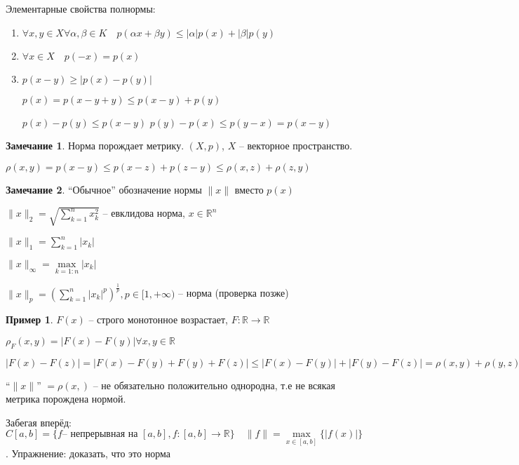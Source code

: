 \documentclass{book}
\newcommand\R{\ensuremath{\mathbb{R}}}
\theoremstyle{definition}
\newtheorem*{note}{Замечание}
\newtheorem*{example}{Пример}
\begin{document}
    Элементарные свойства полнормы:
    \begin{enumerate}
        \item $\forall  x, y\in X \forall \alpha, \beta\in K\quad p(\alpha x+\beta y) \leqslant |\alpha|p(x) + |\beta|p(y)$
        \item $\forall x\in X\quad p(-x) = p(x)$
        \item $p(x-y) \geqslant \left| p(x) - p(y) \right| $

            $p(x) = p(x-y+y) \leqslant p(x-y) + p(y)$

            $p(x) - p(y) \leqslant p(x-y)$
            $p(y) - p(x) \leqslant p(y-x) =p(x-y)$
    \end{enumerate}
    \begin{note}
        Норма порождает метрику. $(X, p)$, $X$ -- векторное пространство.

        $\rho(x, y) = p(x-y) \leqslant p(x-z) + p(z-y) \leqslant  \rho(x, z) + \rho(z, y)$
    \end{note}

    \begin{note}
        ``Обычное'' обозначение нормы $\|x\|$ вместо $p(x)$

        $\|x\|_2 = \sqrt{\sum_{k=1}^{n} x_k^2} $ -- евклидова норма, $x\in \R^n$

        $\|x\|_1 = \sum_{k=1}^{n} |x_k|$

        $\|x\|_{\infty } = \max\limits_{k=1:n} |x_k|$

        $\|x\|_p = \left( \sum_{k=1}^{n} |x_k|^p \right)^{\frac{1}{p}} , p\in [1, +\infty )$ -- норма (проверка позже)
    \end{note}
    \begin{example}
        $F(x)$ -- строго монотонное возрастает, $F:\R\to \R$

        $\rho_F(x,y) = \left| F(x) - F(y) \right| \forall x, y\in \R $

        $\left| F(x) - F(z) \right|  = \left| F(x) - F(y) + F(y) + F(z) \right| \leqslant \left| F(x)  - F(y) \right|  + |F(y) - F(z)| = \rho(x, y) + \rho(y, z)$

        ``$\|x\|$'' $ = \rho(x, )$ -- не обязательно положительно однородна, т.е не всякая метрика порождена нормой.
    \end{example}
    
    Забегая вперёд:  $C[a,b] = \{f \text{-- непрерывная на } [a,b], f:[a,b] \to  \R \}\quad \|f\| = \max\limits_{x\in [a,b]} \{|f(x)|\}$. Упражнение: доказать, что это норма
\end{document}
